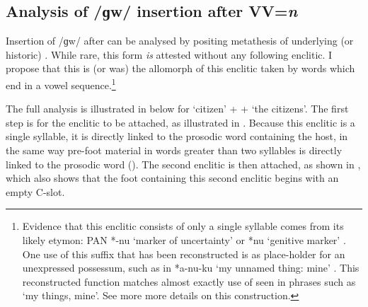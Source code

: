 \subsection{Analysis of /ɡw/ insertion after VV=\it{n}}\label{sec:AnaGwInsVVn}
Insertion of /ɡw/ after  can be analysed by positing
metathesis of underlying (or historic) .
While rare, this form \emph{is} attested without any following enclitic.
I propose that this is (or was) the allomorph of this enclitic taken by
words which end in a vowel sequence.\footnote{
		Evidence that this enclitic consists of only a single syllable
		comes from its likely etymon:
		PAN *-nu `marker of uncertainty' \citep{bltr}
		or *nu `genitive marker' \citep[914]{wo10}.
		One use of this suffix that has been reconstructed
		is as place-holder for an unexpressed possessum,
		such as in *a-nu-ku `my unnamed thing: mine' \citep{bltr}.
		This reconstructed function matches almost exactly use of 
		seen in phrases such as  `my things, mine'.
		See  more more details on this construction.}

The full analysis is illustrated in  below for
 `citizen' +  {\ein} +  {\ii} {\ra}  `the citizens'.
The first step is for the enclitic  to be attached,
as illustrated in .
Because this enclitic is a single syllable,
it is directly linked to the prosodic word containing the host,
in the same way pre-foot material in words greater than two syllables
is directly linked to the prosodic word ().
The second enclitic is then attached,
as shown in , which also shows that the
foot containing this second enclitic begins with an empty C-slot.

